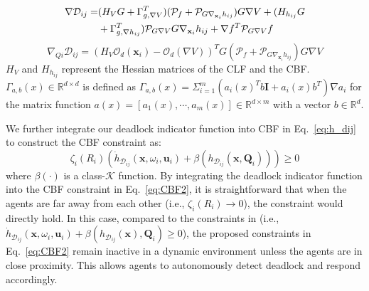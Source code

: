 \documentclass[letterpaper, 10 pt, conference]{ieeeconf}
\theoremstyle{plain}
\begin{document}
{\footnotesize\begin{align} \label{eq:D}
\nabla \mathcal {D}_{ij}= &(H_{V} G + \Gamma ^{T}_{g,\nabla V}) (\mathcal {P}_{f} + \mathcal {P}_{G \nabla_{\mathbf{x}_i} h_{ij}}) G \nabla V +(H_{h_{ij}} G \notag \\
&+ \Gamma ^{{T}}_{g,\nabla h_{ij}}) \mathcal {P}_{G \nabla V} G \nabla_{\mathbf{x}_i} h_{ij} + \nabla f^{{T}} \mathcal {P}_{G \nabla V} f 
\end{align}}
{\footnotesize
\begin{equation}
\nabla _{Qi} \mathcal {D}_{ij} = (H_{V} \mathcal {O}_{d}(\mathbf{x}_i) - \mathcal {O}_{d}(\nabla V))^{{T}} G (\mathcal {P}_{f} + \mathcal {P}_{G \nabla_{\mathbf{x}_i} h_{ij}}) G \nabla V 
\end{equation}}
$H_{V}$ and $H_{h_{ij}}$ represent the Hessian matrices of the CLF and the CBF.
$\Gamma_{a, b}(x) \in \mathbb{R}^{d \times d}$ is defined as $\Gamma _{a, b}(x) = \Sigma_{i=1}^{m}(a_{i}(x)^{T}b\mathbf{I} + a_{i}(x)b^{T})\nabla a_{i}$ for the matrix function $a(x) = [a_{1}(x), \cdots, a_{m}(x)] \in \mathbb{R}^{d \times m}$ with a vector $b \in \mathbb{R}^d$.

We further integrate our deadlock indicator function into CBF in Eq.~\eqref{eq:h_dij} to construct the CBF constraint as:
\begin{equation}\label{eq:CBF2}
\zeta_i(R_i)(\dot{h}_{\mathcal{D}_{ij}}(\mathbf{x}, \omega_i, \mathbf{u}_i) + \beta (h_{\mathcal {D}_{ij}}(\mathbf{x}, \mathbf{Q}_i))) \ge 0
\end{equation}
where $\beta(\cdot)$ is a class-$\mathcal{K}$ function. By integrating the deadlock indicator function into the CBF constraint in Eq.~\eqref{eq:CBF2}, it is straightforward that when the agents are far away from each other (i.e., $\zeta_i(R_i) \rightarrow 0$), the constraint would directly hold. In this case, compared to the constraints in \cite{reis2020control} (i.e., $\dot{h}_{\mathcal{D}_{ij}}(\mathbf{x},\omega_i, \mathbf{u}_i) + \beta (h_{\mathcal{D}_{ij}}(\mathbf{x}), \mathbf{Q}_i) \ge 0$), the proposed constraints in Eq.~\eqref{eq:CBF2} remain inactive in a dynamic environment unless the agents are in close proximity. This allows agents to autonomously detect deadlock and respond accordingly. 
\end{document}
